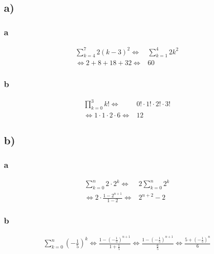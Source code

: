 \documentclass[a4paper, 11pt]{article}
\begin{document}
\subsection{a)}
\label{sec:org06a524a}
\subsubsection{a}
\label{sec:org3802544}
\begin{align*}
    \sum_{k = 4}^{7} 2(k - 3)^2
    \Leftrightarrow& \sum_{k = 1}^{4} 2k^2 \\
    \Leftrightarrow 2 + 8 + 18 + 32
    \Leftrightarrow& 60
\end{align*}

\subsubsection{b}
\label{sec:orgeae9e6c}
\begin{align*}
    \prod_{k = 0}^{3} k!
    \Leftrightarrow& 0! \cdot 1! \cdot 2! \cdot 3! \\
    \Leftrightarrow 1 \cdot 1 \cdot 2 \cdot 6
    \Leftrightarrow& 12
\end{align*}

\subsection{b)}
\label{sec:orgbab1f97}
\subsubsection{a}
\label{sec:orgbb9efce}
\begin{align*}
    \sum_{k = 0}^{n} 2 \cdot 2^k
    \Leftrightarrow& 2 \sum_{k = 0}^{n} 2^k \\
    \Leftrightarrow 2 \cdot \frac{1 - 2^{n + 1}}{1 - 2}
    \Leftrightarrow& 2^{n + 2} - 2
\end{align*}

\subsubsection{b}
\label{sec:orgd714993}
\begin{align*}
    \sum_{k = 0}^{n} (-\frac{1}{5})^k
    \Leftrightarrow \frac{1 - (-\frac{1}{5})^{n + 1}}{1 + \frac{1}{5}}
    \Leftrightarrow \frac{1 - (-\frac{1}{5})^{n + 1}}{\frac{6}{5}}
    \Leftrightarrow \frac{5 + (-\frac{1}{5})^n}{6}
\end{align*}
\end{document}
